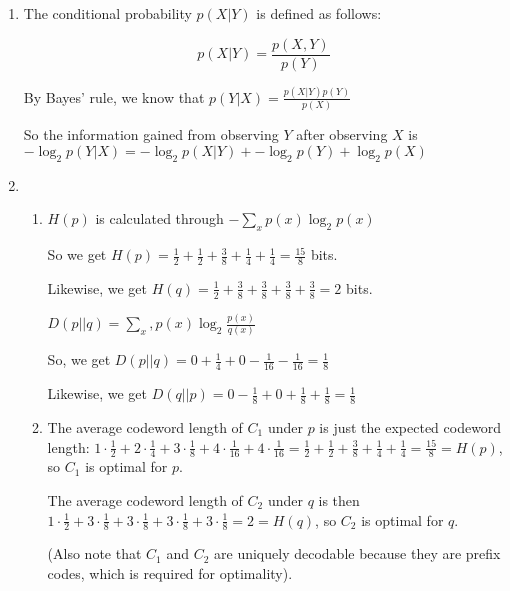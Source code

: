 \documentclass[12pt]{article}
\begin{document}
\begin{enumerate}[label=(\alph*)]
    \item

        The conditional probability $p(X|Y)$ is defined as follows:

        \[
            p(X|Y) = \frac{p(X, Y)}{p(Y)}
        \] 

        By Bayes' rule, we know that $p(Y|X) = \frac{p(X|Y) p(Y)}{p(X)}$

        So the information gained from observing $Y$ after observing $X$ is $-\log_2 p(Y|X) = -\log_2 p(X|Y) + -\log_2 p(Y) + \log_2 p(X)$

    \item

        \begin{enumerate}[label=(\roman*)]
            \item
                $H(p)$ is calculated through $-\sum_x p(x) \log_2 p(x)$

                So we get $H(p) = \frac{1}{2} + \frac{1}{2} + \frac{3}{8} + \frac{1}{4} + \frac{1}{4} = \frac{15}{8}$ bits.

                Likewise, we get $H(q)=\frac{1}{2} + \frac{3}{8} + \frac{3}{8} + \frac{3}{8} + \frac{3}{8} = 2$ bits.

                $D(p||q) = \sum_x, p(x) \log_2 \frac{p(x)}{q(x)}$

                So, we get $D(p||q) = 0 + \frac{1}{4} +0 -\frac{1}{16} - \frac{1}{16} = \frac{1}{8}$

                Likewise, we get $D(q||p) = 0 -\frac{1}{8} + 0 + \frac{1}{8} + \frac{1}{8} = \frac{1}{8}$

            \item

                The average codeword length of $C_1$ under $p$ is just the expected codeword length: $1 \cdot \frac{1}{2} + 2\cdot \frac{1}{4} + 3\cdot \frac{1}{8} + 4 \cdot \frac{1}{16} + 4 \cdot \frac{1}{16} = \frac{1}{2} + \frac{1}{2} + \frac{3}{8} + \frac{1}{4} + \frac{1}{4} = \frac{15}{8} = H(p)$, so $C_1$ is optimal for $p$.

                The average codeword length of $C_2$ under $q$ is then $1 \cdot \frac{1}{2} + 3 \cdot \frac{1}{8} + 3 \cdot \frac{1}{8} + 3 \cdot \frac{1}{8} + 3 \cdot \frac{1}{8} = 2 = H(q)$, so $C_2$ is optimal for $q$.

                (Also note that $C_1$ and $C_2$ are uniquely decodable because they are prefix codes, which is required for optimality).


\end{enumerate}
\end{enumerate}
\end{document}
